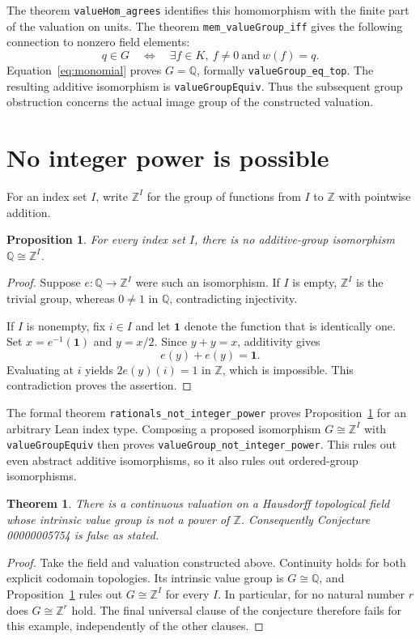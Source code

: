 \documentclass[11pt]{article}
\newtheorem{theorem}{Theorem}
\newtheorem{proposition}{Proposition}
\newcommand{\Q}{\mathbb{Q}}
\newcommand{\Z}{\mathbb{Z}}
\begin{document}
The theorem \texttt{valueHom\_agrees} identifies this homomorphism with the finite part
of the valuation on units. The theorem \texttt{mem\_valueGroup\_iff} gives the following
connection to nonzero field elements:
\[
 q\in G\quad\Longleftrightarrow\quad
 \exists f\in K,\ f\ne0\ \text{and}\ w(f)=q.
\]
Equation~\eqref{eq:monomial} proves $G=\Q$, formally
\texttt{valueGroup\_eq\_top}. The resulting additive isomorphism is
\texttt{valueGroupEquiv}. Thus the subsequent group obstruction concerns the actual image
group of the constructed valuation.

\section{No integer power is possible}

For an index set $I$, write $\Z^I$ for the group of functions from $I$ to $\Z$ with pointwise
addition.

\begin{proposition}\label{prop:obstruction}
For every index set $I$, there is no additive-group isomorphism $\Q\cong\Z^I$.
\end{proposition}
\begin{proof}
Suppose $e:\Q\to\Z^I$ were such an isomorphism.
If $I$ is empty, $\Z^I$ is the trivial group, whereas $0\ne1$ in $\Q$, contradicting
injectivity.

If $I$ is nonempty, fix $i\in I$ and let $\mathbf{1}$ denote the function that is identically
one. Set $x=e^{-1}(\mathbf{1})$ and $y=x/2$. Since $y+y=x$, additivity gives
\[
 e(y)+e(y)=\mathbf{1}.
\]
Evaluating at $i$ yields $2e(y)(i)=1$ in $\Z$, which is impossible. This contradiction
proves the assertion.
\end{proof}

The formal theorem \texttt{rationals\_not\_integer\_power} proves
Proposition~\ref{prop:obstruction} for an arbitrary Lean index type. Composing a proposed
isomorphism $G\cong\Z^I$ with \texttt{valueGroupEquiv} then proves
\texttt{valueGroup\_not\_integer\_power}. This rules out even abstract additive isomorphisms,
so it also rules out ordered-group isomorphisms.

\begin{theorem}
There is a continuous valuation on a Hausdorff topological field whose intrinsic value group
is not a power of $\Z$. Consequently Conjecture 00000005754 is false as stated.
\end{theorem}
\begin{proof}
Take the field and valuation constructed above. Continuity holds for both explicit codomain
topologies. Its intrinsic value group is $G\cong\Q$, and
Proposition~\ref{prop:obstruction} rules out $G\cong\Z^I$ for every $I$.
In particular, for no natural number $r$ does $G\cong\Z^r$ hold. The final universal clause
of the conjecture therefore fails for this example, independently of the other clauses.
\end{proof}
\end{document}
